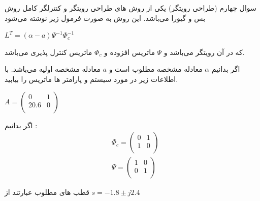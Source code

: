 \documentclass[12pt]{article}
\begin{document}
    
    \begin{problem}{سوال چهارم}
    (طراحی رویتگر) یکی از روش های طراحی رویتگر و کنترلگر کامل روش بس و گیورا می‌باشد. این روش به صورت فرمول زیر نوشته می‌شود 
    
    \raggedleft
    $L^T = (\alpha - a)\Psi^{-1}\Phi_c^{-1}$
    
    \raggedright
    که در آن 
    رویتگر می‌باشد و $\Psi$ ماتریس  افزوده و $\Phi_c$ ماتریس کنترل پذیری می‌باشد.
    
    اگر بدانیم $\alpha$ معادله مشخصه مطلوب است و $a$ معادله مشخصه اولیه می‌باشد. با اطلاعات زیر در مورد سیستم و پارامتر ها ماتریس  را بیابید.
    
    \raggedleft
     $A=\left( \begin{matrix}
     	0 & 1  \\
     	20.6 & 0  \\
     \end{matrix} \right)$
     
     \raggedright
     اگر بدانیم :
     \begin{align}
     	& {{\Phi }_{c}}=\left( \begin{matrix}
     		0 & 1  \\
     		1 & 0  \\
     	\end{matrix} \right) \nonumber \\ 
     	& \Psi =\left( \begin{matrix}
     		1 & 0  \\
     		0 & 1  \\
     	\end{matrix} \right)\nonumber 
     \end{align}
     
     قطب های مطلوب عبارتند از 
     $s = -1.8 \pm j2.4$
     
     
    \end{problem}
    
    
\end{document}
